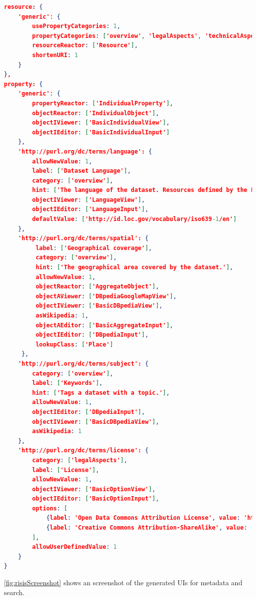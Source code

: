 \documentclass{acm_proc_article-sp}
\begin{document}
\begin{lstlisting}[language=json,firstnumber=1, label=code:config, caption=An excerpt of LD-R config for RISIS]
resource: {
    'generic': {
        usePropertyCategories: 1,
        propertyCategories: ['overview', 'legalAspects', 'technicalAspects'],
        resourceReactor: ['Resource'],
        shortenURI: 1
    }
},
property: {
    'generic': {
        propertyReactor: ['IndividualProperty'],
        objectReactor: ['IndividualObject'],
        objectIViewer: ['BasicIndividualView'],
        objectIEditor: ['BasicIndividualInput']
    },
    'http://purl.org/dc/terms/language': {
        allowNewValue: 1,
        label: ['Dataset Language'],
        category: ['overview'],
        hint: ['The language of the dataset. Resources defined by the Library of Congress (http://id.loc.gov/vocabulary/iso639-1.html, http://id.loc.gov/vocabulary/iso639-2.html) SHOULD be used.'],
        objectIViewer: ['LanguageView'],
        objectIEditor: ['LanguageInput'],
        defaultValue: ['http://id.loc.gov/vocabulary/iso639-1/en']
    },
    'http://purl.org/dc/terms/spatial': {
         label: ['Geographical coverage'],
         category: ['overview'],
         hint: ['The geographical area covered by the dataset.'],
         allowNewValue: 1,
         objectReactor: ['AggregateObject'],
         objectAViewer: ['DBpediaGoogleMapView'],
         objectIViewer: ['BasicDBpediaView'],
         asWikipedia: 1,
         objectAEditor: ['BasicAggregateInput'],
         objectIEditor: ['DBpediaInput'],
         lookupClass: ['Place']
     },
    'http://purl.org/dc/terms/subject': {
        category: ['overview'],
        label: ['Keywords'],
        hint: ['Tags a dataset with a topic.'],
        allowNewValue: 1,
        objectIEditor: ['DBpediaInput'],
        objectIViewer: ['BasicDBpediaView'],
        asWikipedia: 1
    },
    'http://purl.org/dc/terms/license': {
        category: ['legalAspects'],
        label: ['License'],
        allowNewValue: 1,
        objectIViewer: ['BasicOptionView'],
        objectIEditor: ['BasicOptionInput'],
        options: [
            {label: 'Open Data Commons Attribution License', value: 'http://www.opendatacommons.org/licenses/by/'},
            {label: 'Creative Commons Attribution-ShareAlike', value: 'http://creativecommons.org/licenses/by-sa/3.0/'}
        ],
        allowUserDefinedValue: 1
    }   
}
\end{lstlisting}

\autoref{fig:risisScreenshot} shows an screenshot of the generated UIs for metadata and search.
\end{document}
